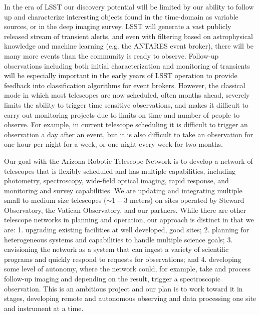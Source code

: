 \documentclass[]{spie}  %
\begin{document}
In the era of LSST our discovery potential will be limited by our ability to follow up and characterize interesting objects found in the time-domain as variable sources, or in the deep imaging survey.  LSST will generate a vast publicly released stream of transient alerts, and even with filtering based on astrophysical knowledge and machine learning (e.g. the ANTARES event broker\cite{Saha16, Narayan18}), there will be many more events than the community is ready to observe. Follow-up observations including both initial characterization and monitoring of transients will be especially important in the early years of LSST operation to provide feedback into classification algorithms for event brokers. However, the classical mode in which most telescopes are now scheduled, often months ahead, severely limits the ability to trigger time sensitive observations, and makes it difficult to carry out monitoring projects due to limits on time and number of people to observe.  For example, in current telescope scheduling it is difficult to trigger an observation a day after an event, but it is also difficult to take an observation for one hour per night for a week, or one night every week for two months.

Our goal with the Arizona Robotic Telescope Network is to develop a network of telescopes that is flexibly scheduled and has multiple capabilities, including photometry, spectroscopy, wide-field optical imaging, rapid response, and monitoring and survey capabilities. We are updating and integrating multiple small to medium size telescopes ($\sim1-3$ meters) on sites operated by Steward Observatory, the Vatican Observatory, and our partners. While there are other telescope networks in planning and operation, our approach is distinct in that we are: 1. upgrading existing facilities at well developed, good sites; 2. planning for heterogeneous systems and capabilities to handle multiple science goals; 3. envisioning the network as a system that can ingest a variety of scientific programs and quickly respond to requests for observations; and 4. developing some level of autonomy, where the network could, for example, take and process follow-up imaging and depending on the result, trigger a spectroscopic observation.  This is an ambitious project and our plan is to work toward it in stages, developing remote and autonomous observing and data processing one site and instrument at a time.
\end{document}
